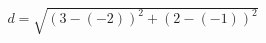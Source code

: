 \documentclass[preview]{standalone}
\begin{document}
\begin{align*}
d = \sqrt{(3 - (-2))^2 + (2 - (-1))^2}
\end{align*}
\end{document}

